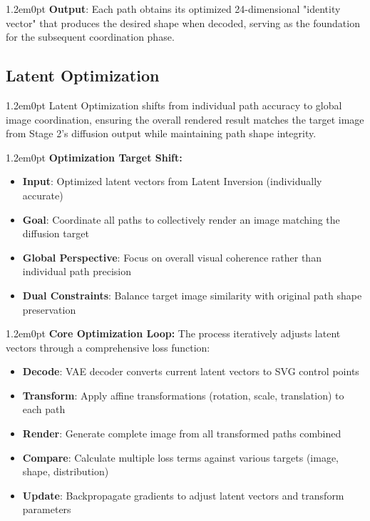 \documentclass[10pt,a4paper]{article}
\newenvironment{bodytext}{\begin{adjustwidth}{1.2em}{0pt}}{\end{adjustwidth}}
\begin{document}
\begin{bodytext}
\textbf{Output}: Each path obtains its optimized 24-dimensional "identity vector" that produces the desired shape when decoded, serving as the foundation for the subsequent coordination phase.
\end{bodytext}

\subsection{Latent Optimization}

\begin{bodytext}
Latent Optimization shifts from individual path accuracy to global image coordination, ensuring the overall rendered result matches the target image from Stage 2's diffusion output while maintaining path shape integrity.
\end{bodytext}

\begin{bodytext}
\textbf{Optimization Target Shift:}
\begin{itemize}
\item \textbf{Input}: Optimized latent vectors from Latent Inversion (individually accurate)
\item \textbf{Goal}: Coordinate all paths to collectively render an image matching the diffusion target
\item \textbf{Global Perspective}: Focus on overall visual coherence rather than individual path precision
\item \textbf{Dual Constraints}: Balance target image similarity with original path shape preservation
\end{itemize}
\end{bodytext}

\begin{bodytext}
\textbf{Core Optimization Loop:} The process iteratively adjusts latent vectors through a comprehensive loss function:
\begin{itemize}
\item \textbf{Decode}: VAE decoder converts current latent vectors to SVG control points
\item \textbf{Transform}: Apply affine transformations (rotation, scale, translation) to each path
\item \textbf{Render}: Generate complete image from all transformed paths combined
\item \textbf{Compare}: Calculate multiple loss terms against various targets (image, shape, distribution)
\item \textbf{Update}: Backpropagate gradients to adjust latent vectors and transform parameters
\end{itemize}
\end{bodytext}
\end{document}
